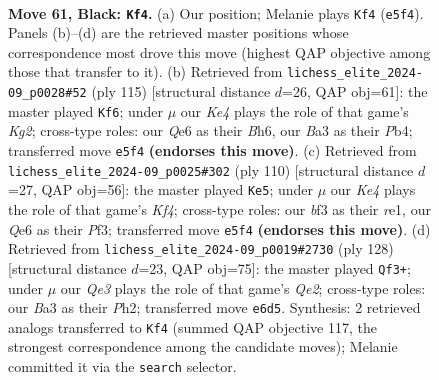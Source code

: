 \documentclass[11pt]{article}
\begin{document}
\clearpage

\begin{figure}[p]\centering
\begin{subfigure}{0.46\textwidth}\centering
\resizebox{\linewidth}{!}{%
\newchessgame
\chessboard[
  setfen={8/8/4q3/R3k3/1p6/b4B2/6K1/8 b - - 13 61},
  showmover=false,
  pgfstyle=straightmove, color=movearrow, markmove={e5-f4}
]}
\caption{}
\end{subfigure}\hfill
\begin{subfigure}{0.46\textwidth}\centering
\resizebox{\linewidth}{!}{%
\newchessgame
\chessboard[
  setfen={8/1R4k1/7b/5B2/1p4P1/2r5/6K1/8 b - - 1 58},
  showmover=false,
  pgfstyle=straightmove, color=movearrow, markmove={g7-f6}
]}
\caption{}
\end{subfigure}
\\[4pt]
\begin{subfigure}{0.46\textwidth}\centering
\resizebox{\linewidth}{!}{%
\newchessgame
\chessboard[
  setfen={1R6/5r2/8/k7/4BK2/5P2/8/4r3 w - - 8 56},
  showmover=false,
  pgfstyle=straightmove, color=movearrow, markmove={f4-e5}
]}
\caption{}
\end{subfigure}\hfill
\begin{subfigure}{0.46\textwidth}\centering
\resizebox{\linewidth}{!}{%
\newchessgame
\chessboard[
  setfen={8/1k5p/5r2/8/8/8/4QK1P/8 w - - 25 65},
  showmover=false,
  pgfstyle=straightmove, color=movearrow, markmove={e2-f3}
]}
\caption{}
\end{subfigure}
\caption{\textbf{Move 61, Black: \texttt{Kf4}.} (a) Our position; Melanie plays \texttt{Kf4} (\texttt{e5f4}). Panels (b)--(d) are the retrieved master positions whose correspondence most drove this move (highest QAP objective among those that transfer to it). (b) Retrieved from \texttt{lichess\_elite\_2024-09\_p0028\#52} (ply 115) [structural distance $d$=26, QAP obj=61]: the master played \texttt{Kf6}; under $\mu$ our \emph{Ke4} plays the role of that game's \emph{Kg2}; cross-type roles: our \emph{Q}e6 as their \emph{B}h6, our \emph{B}a3 as their \emph{P}b4; transferred move \texttt{e5f4} \textbf{(endorses this move)}. (c) Retrieved from \texttt{lichess\_elite\_2024-09\_p0025\#302} (ply 110) [structural distance $d$=27, QAP obj=56]: the master played \texttt{Ke5}; under $\mu$ our \emph{Ke4} plays the role of that game's \emph{Kf4}; cross-type roles: our \emph{b}f3 as their \emph{r}e1, our \emph{Q}e6 as their \emph{P}f3; transferred move \texttt{e5f4} \textbf{(endorses this move)}. (d) Retrieved from \texttt{lichess\_elite\_2024-09\_p0019\#2730} (ply 128) [structural distance $d$=23, QAP obj=75]: the master played \texttt{Qf3+}; under $\mu$ our \emph{Qe3} plays the role of that game's \emph{Qe2}; cross-type roles: our \emph{B}a3 as their \emph{P}h2; transferred move \texttt{e6d5}. Synthesis: 2 retrieved analogs transferred to \texttt{Kf4} (summed QAP objective 117, the strongest correspondence among the candidate moves); Melanie committed it via the \texttt{search} selector.}
\label{fig:thought-m121}
\end{figure}
\end{document}
